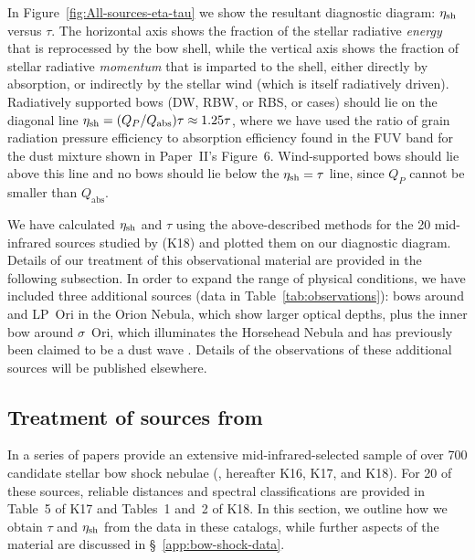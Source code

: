In Figure~\ref{fig:All-sources-eta-tau} we show the resultant
diagnostic diagram: \(\eta_{\text{sh}}\) versus \(\tau\).  The horizontal axis
shows the fraction of the stellar radiative \emph{energy} that is
reprocessed by the bow shell, while the vertical axis shows the
fraction of stellar radiative \emph{momentum} that is imparted to the
shell, either directly by absorption, or indirectly by the stellar
wind (which is itself radiatively driven).  Radiatively supported bows
(DW, RBW, or RBS, or cases) should lie on the diagonal line
\(\eta_{\text{sh}} = ( Q_P / Q_{\text{abs}}) \tau \approx 1.25 \tau\), where we have used
the ratio of grain radiation pressure efficiency to absorption
efficiency found in the FUV band for the dust mixture shown in
Paper~II's Figure~6.  Wind-supported bows should lie above this line
and no bows should lie below the \(\eta_{\text{sh}} = \tau\) line, since
\(Q_P\) cannot be smaller than \(Q_{\text{abs}}\).

We have calculated \(\eta_{\text{sh}}\) and \(\tau\) using the above-described
methods for the 20 mid-infrared sources studied by
\citet{Kobulnicky:2018a} (K18) and plotted them on our diagnostic
diagram.  Details of our treatment of this observational material are
provided in the following subsection.  In order to expand the range of
physical conditions, we have included three additional sources (data
in Table~\ref{tab:observations}): bows around \thD{}
\citep{Smith:2005a} and LP~Ori \citep{ODell:2001c} in the Orion
Nebula, which show larger optical depths, plus the inner bow around
\(\sigma\)~Ori, which illuminates the Horsehead Nebula and has previously
been claimed to be a dust wave \citep{Ochsendorf:2014b,
  Ochsendorf:2015a}.  Details of the observations of these additional
sources will be published elsewhere.


\subsection{Treatment of sources from \citeauthor{Kobulnicky:2018a}}
\label{sec:kobulnicky}


In a series of papers \citeauthor{Kobulnicky:2018a} provide an
extensive mid-infrared-selected sample of over 700 candidate stellar
bow shock nebulae (\citealp{Kobulnicky:2016a, Kobulnicky:2017a,
  Kobulnicky:2018a}, hereafter K16, K17, and K18).  For 20 of these
sources, reliable distances and spectral classifications are provided
in Table~5 of K17 and Tables~1 and~2 of K18. In this section, we
outline how we obtain \(\tau\) and \(\eta_{\text{sh}}\) from the data in these
catalogs, while further aspects of the \citeauthor{Kobulnicky:2018a}
material are discussed in \S~\ref{app:bow-shock-data}.

